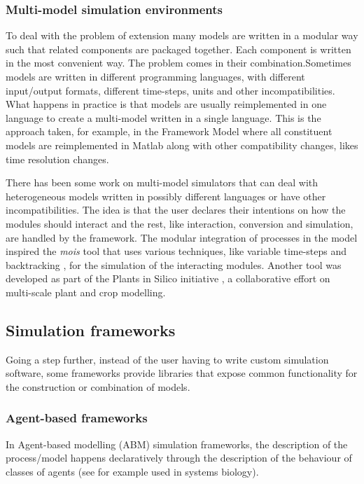 \subsubsection{Multi-model simulation environments}
To deal with the problem of extension many models are written in a modular way
such that related components are packaged together. Each component is written in
the most convenient way. The problem comes in their combination.Sometimes models
are written in different programming languages, with different input/output
formats, different time-steps, units and other incompatibilities. What happens
in practice is that models are usually reimplemented in one language to create a
multi-model written in a single language. This is the approach taken, for
example, in the Framework Model where all constituent models are reimplemented
in Matlab along with other compatibility changes, likes time resolution changes.

There has been some work on multi-model simulators that can deal with
heterogeneous models written in possibly different languages or have other
incompatibilities. The idea is that the user declares their intentions on how
the modules should interact and the rest, like interaction, conversion and
simulation, are handled by the framework. The modular integration of processes
in the \citet{karr_whole-cell_2012} model inspired the \emph{mois} tool
\citep{erbm_mois_2015} that uses various techniques, like variable time-steps
and backtracking \citep{bucher2013decomposition}, for the simulation of the
interacting modules. Another tool \citep{cis_2018} was developed as part of the
Plants in Silico initiative \citep{zhu_plants_2016}, a collaborative effort on
multi-scale plant and crop modelling.

\subsection{Simulation frameworks}
\label{sec:simFrameworks}
Going a step further, instead of the user having to write custom simulation
software, some frameworks provide libraries that expose common functionality for
the construction or combination of models.

\subsubsection*{Agent-based frameworks}
In Agent-based modelling (ABM) simulation frameworks, the description of the
process/model happens declaratively through the description of the behaviour of
classes of agents (see for example \cite{solovyev_spark:_2010} used in systems
biology).

